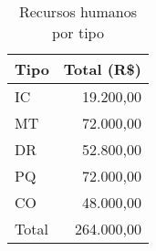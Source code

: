 \begin{table}[!h]
\centering
	\caption{Recursos humanos por tipo}
\begin{tabular}{ lr}
\toprule
   Tipo  & Total (R\$) \\
\midrule
   IC    &   19.200,00 \\
   MT    &   72.000,00 \\
   DR    &   52.800,00 \\
   PQ    &   72.000,00 \\
   CO    &   48.000,00 \\
\midrule
   Total     &   264.000,00 \\
\bottomrule
\end{tabular}
	\label{tab:rhtipo}
\end{table}
 
\newpage

